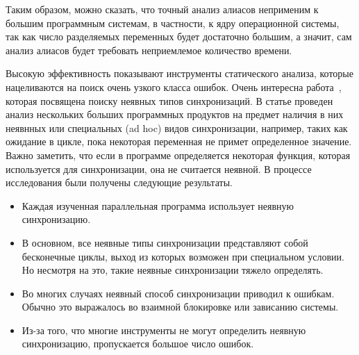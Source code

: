 Таким образом, можно сказать, что точный анализ алиасов неприменим к большим программным системам, в частности, к ядру операционной системы, так как число разделяемых переменных будет достаточно большим, а значит, сам анализ алиасов будет требовать неприемлемое количество времени.



Высокую эффективность показывают инструменты статического анализа, которые нацеливаются на поиск очень узкого класса ошибок.
Очень интересна работа~\cite{Xiong:2010}, которая посвящена поиску неявных типов синхронизаций.
В статье проведен анализ нескольких больших программных продуктов на предмет наличия в них неявнных или специальных (ad hoc) видов синхронизации, например, таких как ожидание в цикле, пока некоторая переменная не примет определенное значение.
Важно заметить, что если в программе определяется некоторая функция, которая используется для синхронизации, она не считается неявной.
В процессе исследования были получены следующие результаты.

\begin{itemize}
\item Каждая изученная параллельная программа использует неявную синхронизацию.
\item В основном, все неявные типы синхронизации представляют собой бесконечные циклы, выход из которых возможен при специальном условии. Но несмотря на это, такие неявные синхронизации тяжело определять.
\item Во многих случаях неявный способ синхронизации приводил к ошибкам. Обычно это выражалось во взаимной блокировке или зависанию системы. 
\item Из-за того, что многие инструменты не могут определить неявную синхронизацию, пропускается большое число ошибок. 
\end{itemize}

